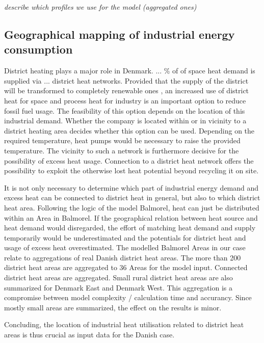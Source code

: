 \documentclass[review]{elsarticle}
\begin{document}
\textit{describe which profiles we use for the model (aggregated ones)}


\subsection{Geographical mapping of industrial energy consumption}
District heating plays a major role in Denmark. ... \% of of space heat demand is supplied via ... district heat networks. Provided that the supply of the district will be transformed to completely renewable ones , an increased use of district heat for space and process heat for industry is an important option to reduce fossil fuel usage. The feasibility of this option depends on the location of this industrial demand. Whether the company is located within or in vicinity to a district heating area decides whether this option can be used. Depending on the required temperature, heat pumps would be necessary to raise the provided temperature. The vicinity to such a network is furthermore decisive for the possibility of excess heat usage. Connection to a district heat network offers the possibility to exploit the otherwise lost heat potential beyond recycling it on site.

It is not only necessary to determine which part of industrial energy demand and excess heat can be connected to district heat in general, but also to which district heat area. Following the logic of the model Balmorel, heat can just be distributed within an Area in Balmorel. If the geographical relation between heat source and heat demand would disregarded, the effort of matching heat demand and supply temporarily would be underestimated and the potentials for district heat and usage of excess heat overestimated. The modelled Balmorel Areas in our case relate to aggregations of real Danish district heat areas. The more than 200 district heat areas are aggregated to 36 Areas for the model input. Connected district heat areas are aggregated. Small rural district heat areas are also summarized for Denmark East and Denmark West. This aggregation is a compromise between model complexity / calculation time and accurancy. Since mostly small areas are summarized, the effect on the results is minor.

Concluding, the location of industrial heat utilisation related to district heat areas is thus crucial as input data for the Danish case.
\end{document}
